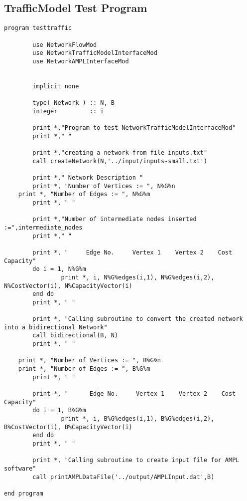 \documentclass[10pt,a4paper,margin = 1.25cm]{article}
\begin{document}
\subsection*{TrafficModel Test Program}
\begin{lstlisting}
program testtraffic
		
		use NetworkFlowMod
		use NetworkTrafficModelInterfaceMod
		use NetworkAMPLInterfaceMod
		
		
		implicit none
		
		type( Network ) :: N, B
		integer         :: i
		
		print *,"Program to test NetworkTrafficModelInterfaceMod"
		print *," "
		
		print *,"creating a network from file inputs.txt"
		call createNetwork(N,'../input/inputs-small.txt')
		
		print *," Network Description "
		print *, "Number of Vertices := ", N%G%n
    print *, "Number of Edges := ", N%G%m
		print *, " "
		
		print *,"Number of intermediate nodes inserted :=",intermediate_nodes
		print *," "
		
		print *, "     Edge No.     Vertex 1    Vertex 2    Cost    Capacity"
		do i = 1, N%G%m
				print *, i, N%G%edges(i,1), N%G%edges(i,2), N%CostVector(i), N%CapacityVector(i)
		end do
		print *, " "
		
		print *, "Calling subroutine to convert the created network into a bidirectional Network"
		call bidirectional(B, N)
		print *, " "
    
    print *, "Number of Vertices := ", B%G%n
    print *, "Number of Edges := ", B%G%m
		print *, " "
		
		print *, "      Edge No.     Vertex 1    Vertex 2    Cost    Capacity"
		do i = 1, B%G%m
				print *, i, B%G%edges(i,1), B%G%edges(i,2), B%CostVector(i), B%CapacityVector(i)
		end do
		print *, " "
		
		print *, "Calling subroutine to create input file for AMPL software"
		call printAMPLDataFile('../output/AMPLInput.dat',B)

end program
		
\end{lstlisting}
\end{document}
